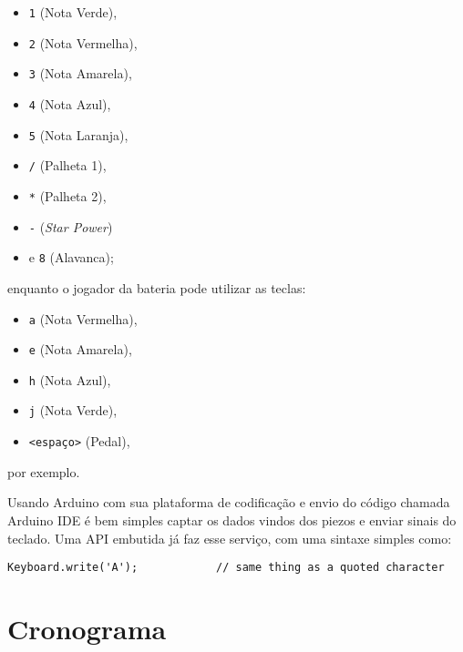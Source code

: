 \begin{itemize}
\itemsep1pt\parskip0pt
\item
  \texttt{1} (Nota Verde),
\item
  \texttt{2} (Nota Vermelha),
\item
  \texttt{3} (Nota Amarela),
\item
  \texttt{4} (Nota Azul),
\item
  \texttt{5} (Nota Laranja),
\item
  \texttt{/} (Palheta 1),
\item
  \texttt{*} (Palheta 2),
\item
  \texttt{-} (\emph{Star Power})
\item
  e \texttt{8} (Alavanca);
\end{itemize}

enquanto o jogador da bateria pode utilizar as teclas:

\begin{itemize}
\itemsep1pt\parskip0pt
\item
  \texttt{a} (Nota Vermelha),
\item
  \texttt{e} (Nota Amarela),
\item
  \texttt{h} (Nota Azul),
\item
  \texttt{j} (Nota Verde),
\item
  \texttt{\textless{}espaço\textgreater{}} (Pedal),
\end{itemize}

por exemplo.

Usando Arduino \cite{arduino-2005} com sua plataforma de codificação e
envio do código chamada Arduino IDE \cite{arduino-ide-2008} é bem
simples captar os dados vindos dos piezos e enviar sinais do teclado.
Uma API embutida já faz esse serviço, com uma sintaxe simples como:

\begin{verbatim}
Keyboard.write('A');            // same thing as a quoted character
\end{verbatim}

\section{Cronograma}\label{cronograma}

